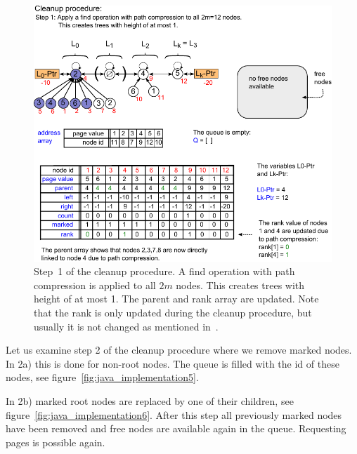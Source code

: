 \documentclass[a4paper,12pt, titlepage]{article}  %
\begin{document}
\begin{figure}[htp]
	\centering
	\includegraphics[scale=0.95]{./figures/java_implementation4.pdf}
	\caption{Step~1 of the cleanup procedure. A find operation with path compression is applied to all $2m$ nodes. 
                    This creates trees with height of at most 1. The parent and rank array are updated. Note that the rank
                    is only updated during the cleanup procedure, but usually it is not changed as mentioned in~\cite{brPreiss_onlineBook}.} 
	\label{fig:java_implementation4}
\end{figure}

\noindent Let us examine step 2 of the cleanup procedure where we remove marked nodes. 
In 2a) this is done for non-root nodes. The queue is filled with the id of these nodes, 
see figure~\ref{fig:java_implementation5}.

In 2b) marked root nodes are replaced by one of their children, see figure~\ref{fig:java_implementation6}.
After this step all previously marked nodes have been removed and free nodes are available again in the queue. 
Requesting pages is possible again.
\end{document}
